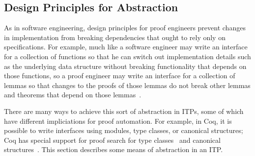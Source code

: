 
\subsection{Design Principles for Abstraction} %
\label{sec:desabs}

As in software engineering, design principles for proof engineers prevent changes in implementation
from breaking dependencies that ought to rely only on specifications.
For example, much like a software engineer may write an interface for a collection of functions so that he can
switch out implementation details such as the underlying data structure %
without breaking functionality that
depends on those functions, so a proof engineer may write an interface for a collection of lemmas
so that changes to the proofs of those lemmas do not break other lemmas and theorems that depend on those lemmas~\citep{Woos2016}.

There are many ways to achieve this sort of abstraction in ITPs,
some of which have different impliciations for proof automation. For example,
in Coq, it is possible to write interfaces using modules, type classes, or canonical structures;
Coq has special support for proof search for type classes~\citep{Sozeau2008} and canonical structures~\citep{Saibi:PhD}. %
This section describes some means of abstraction in an ITP.



